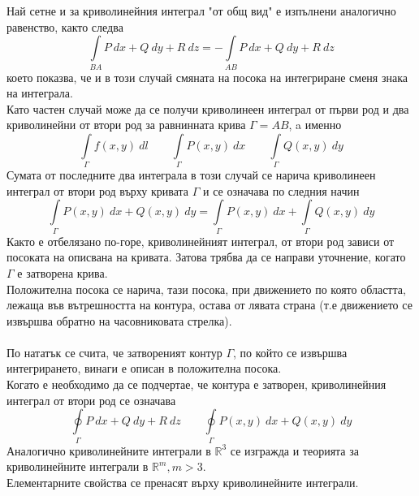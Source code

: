 \documentclass[a4paper,fleqn,12pt]{article}
\theoremstyle{definition}
\begin{document}
Най сетне и за криволинейния интеграл "от общ вид" е изпълнени аналогично равенство, както следва
$$\int\limits_{BA} P \ dx + Q \ dy + R \ dz = -\int\limits_{AB} P \ dx + Q \ dy + R \ dz$$
което показва, че и в този случай смяната на посока на интегриране сменя знака на интеграла. \\
Като частен случай може да се получи криволинеен интеграл от първи род и два криволинейни от втори род за равнинната крива $\Gamma = AB$, a именно 
$$\int\limits_{\Gamma} f(x,y) \ dl \qquad \int\limits_{\Gamma} P(x,y) \ dx \qquad \int\limits_{\Gamma} Q(x,y) \ dy$$
Сумата от последните два интеграла в този случай се нарича криволинеен интеграл от втори род върху кривата $\Gamma$ и се означава по следния начин
$$ \int\limits_{\Gamma} P(x,y) \ dx + Q(x,y) \ dy = \int\limits_{\Gamma} P(x,y) \ dx +\int\limits_{\Gamma} Q(x,y) \ dy$$
Както е отбелязано по-горе, криволинейният интеграл, от втори род зависи от посоката на описвана на кривата.
Затова трябва да се направи уточнение, когато $\Gamma$ е затворена крива. \\
Положителна посока се нарича, тази посока, при движението по която областта, лежаща във вътрешността на контура, остава от лявата страна (т.е движението се извършва обратно на часовниковата стрелка).\\
\\
По нататък се счита, че затвореният контур $\Gamma$, по който се извършва интегрирането, винаги е описан в положителна посока. \\
Когато е необходимо да се подчертае, че контура е затворен, криволинейния интеграл от втори род се означава 
$$\oint\limits_{\Gamma} P \ dx + Q \ dy + R \ dz  \qquad \oint\limits_{\Gamma} P(x,y) \ dx + Q(x,y) \ dy $$
Аналогично криволинейните интеграли в $\mathbb{R}^3$ се изгражда и теорията за криволинейните интеграли в $\mathbb{R}^m, m>3$. \\
Елементарните свойства се пренасят върху криволинейните интеграли.
\end{document}
